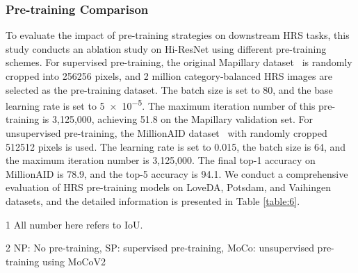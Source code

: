 \documentclass[journal]{IEEEtran}
\begin{document}
\subsubsection{Pre-training Comparison}
To evaluate the impact of pre-training strategies on downstream HRS tasks, this study conducts an ablation study on Hi-ResNet using different pre-training schemes. For supervised pre-training, the original Mapillary dataset~\cite{neuhold2017mapillary} is randomly cropped into 256256 pixels, and 2 million category-balanced HRS images are selected as the pre-training dataset. The batch size is set to 80, and the base learning rate is set to \num{5e-5}. The maximum iteration number of this pre-training is 3,125,000, achieving 51.8 on the Mapillary validation set. For unsupervised pre-training, the MillionAID dataset~\cite{long2021creating} with randomly cropped 512512 pixels is used. The learning rate is set to 0.015, the batch size is 64, and the maximum iteration number is 3,125,000. The final top-1 accuracy on MillionAID is 78.9, and the top-5 accuracy is 94.1. We conduct a comprehensive evaluation of HRS pre-training models on LoveDA, Potsdam, and Vaihingen datasets, and the detailed information is presented in Table \ref{table:6}.


\begin{table}[!ht]
  \begin{center}
  \begin{threeparttable}
    \begin{tablenotes}
        \footnotesize  
        \item[1] All number here refers to IoU. 
        \item[2] NP: No pre-training, SP: supervised pre-training, MoCo: unsupervised pre-training using MoCoV2
        
      \end{tablenotes} 
    \end{threeparttable}
  \end{center}
  \label{table:6}
\end{table}
\end{document}
